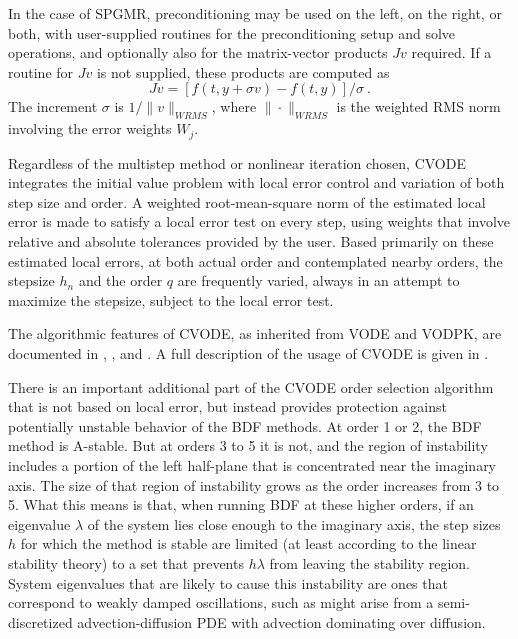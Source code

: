 In the case of SPGMR, preconditioning may be used on the left, on the
right, or both, with user-supplied routines for the preconditioning
setup and solve operations, and optionally also for the matrix-vector
products $Jv$ required.  If a routine for $Jv$ is not supplied, these
products are computed as
\begin{equation}
Jv = [f(t,y+\sigma v) - f(t,y)]/\sigma ~. 
\label{jacobv}
\end{equation}
The increment $\sigma$ is $1/\|v\|_{WRMS}$, where $\|\cdot\|_{WRMS}$
is the weighted RMS norm involving the error weights $W_j$.

Regardless of the multistep method or nonlinear iteration chosen,
CVODE integrates the initial value problem with local error control
and variation of both step size and order.  A weighted root-mean-square
norm of the estimated local error is made to satisfy a local error test on
every step, using weights that involve relative and absolute
tolerances provided by the user.  Based primarily on these estimated
local errors, at both actual order and contemplated nearby orders, the
stepsize $h_n$ and the order $q$ are frequently varied, always in an
attempt to maximize the stepsize, subject to the local error test.

The algorithmic features of CVODE, as inherited from VODE and
VODPK, are documented in \cite{BBH:89}, \cite{Byr:92}, and
\cite{Hin:00}. A full description of the usage of CVODE is given in
\cite{HiSe:03a}.

There is an important additional part of the CVODE order selection
algorithm that is not based on local error, but instead provides
protection against potentially unstable behavior of the BDF methods.
At order 1 or 2, the BDF method is A-stable.  But at orders 3 to 5 it
is not, and the region of instability includes a portion of the left
half-plane that is concentrated near the imaginary axis.  The size of
that region of instability grows as the order increases from 3 to 5.
What this means is that, when running BDF at these higher orders, if
an eigenvalue $\lambda$ of the system lies close enough to the
imaginary axis, the step sizes $h$ for which the method is stable are
limited (at least according to the linear stability theory) to a set
that prevents $h\lambda$ from leaving the stability region.  System
eigenvalues that are likely to cause this instability are ones that
correspond to weakly damped oscillations, such as might arise from a
semi-discretized advection-diffusion PDE with advection dominating
over diffusion.

